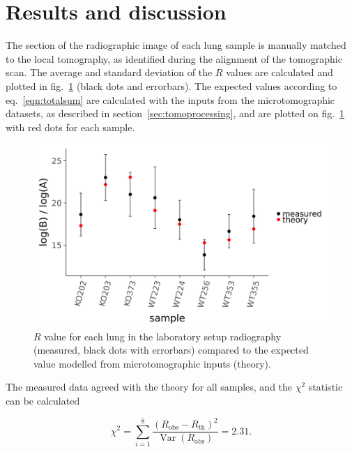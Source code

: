 \section{Results and discussion}\label{sec:results}
The section of the radiographic image of each lung sample is manually
matched to the local tomography, as identified during the alignment of the
tomographic scan. The average and standard deviation of the $R$ values are
calculated and plotted in fig.~\ref{206272} (black dots and errorbars). The expected
values according to eq.~\ref{eqn:totalsum} are calculated with the inputs from the
microtomographic datasets, as described in section~\ref{sec:tomoprocessing}, and are plotted on
fig.~\ref{206272} with red dots for each sample.
\begin{figure}[h!]
\begin{center}
\includegraphics[width=\textwidth]{gfx/lung-paper-figures/samples/samples}
\caption[Comparison of the theoretical estimate and experimental values of
the dark-field signal.]{{\(R\) value for each lung in the laboratory setup
radiography (measured, black dots with errorbars) compared to the
expected value modelled from microtomographic inputs (theory).
{\label{206272}}%
}}
\end{center}
\end{figure}


The measured data agreed with the
theory for all samples, and the $\chi^2$ statistic can be calculated

\begin{equation}
    \chi^2 = \sum_{i=1}^8 \dfrac{(R_{\text{obs}} -
    R_{\text{th}})^2}{\mathop{\mathrm{Var}}(R_{\text{obs}})} = 2.31.
    \label{eqn:chisq}
\end{equation}

